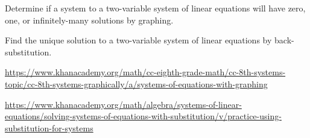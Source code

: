 

\begin{readinessAssuranceOutcomes}
\item Determine if a system to a two-variable system of linear equations
      will have zero, one, or infinitely-many solutions by graphing.
\item Find the unique solution to a two-variable system of linear equations
      by back-substitution.
\end{readinessAssuranceOutcomes}

\begin{readinessAssuranceResources}
\item \url{https://www.khanacademy.org/math/cc-eighth-grade-math/cc-8th-systems-topic/cc-8th-systems-graphically/a/systems-of-equations-with-graphing}
\item \url{https://www.khanacademy.org/math/algebra/systems-of-linear-equations/solving-systems-of-equations-with-substitution/v/practice-using-substitution-for-systems}
\end{readinessAssuranceResources}




